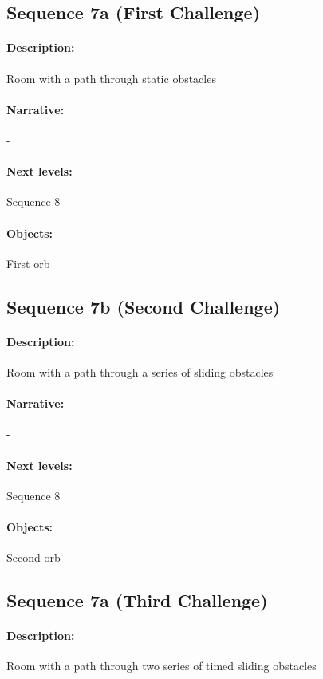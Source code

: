 \documentclass{article}
\begin{document}
\subsection{Sequence 7a (First Challenge)}

\paragraph{Description: } Room with a path through static obstacles
\paragraph{Narrative: } -
\paragraph{Next levels: } Sequence 8
\paragraph{Objects: } First orb

\subsection{Sequence 7b (Second Challenge)}

\paragraph{Description: } Room with a path through a series of sliding obstacles
\paragraph{Narrative: } -
\paragraph{Next levels: } Sequence 8
\paragraph{Objects: } Second orb

\subsection{Sequence 7a (Third Challenge)}

\paragraph{Description: } Room with a path through two series of timed sliding obstacles
\end{document}
